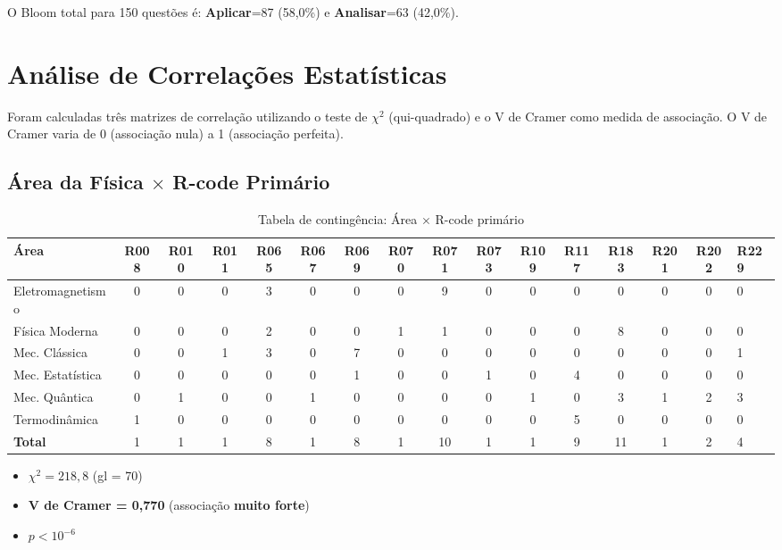 \documentclass[12pt,a4paper]{article}
\newcommand{\bloom}[1]{\textcolor{verdeexame}{\textbf{#1}}}
\begin{document}
O Bloom total para 150 questões é: \bloom{Aplicar}=87 (58,0\%) e
\bloom{Analisar}=63 (42,0\%).

\section{Análise de Correlações Estatísticas}

Foram calculadas três matrizes de correlação utilizando o teste de
$\chi^2$ (qui-quadrado) e o V de Cramer como medida de associação.
O V de Cramer varia de 0 (associação nula) a 1 (associação perfeita).

\subsection{Área da Física $\times$ R-code Primário}

\begin{table}[H]
\centering
\caption{Tabela de contingência: Área $\times$ R-code primário}
\label{tab:area_rcode}
\begin{tabular}{lcccccccccccccc}
\toprule
\textbf{Área} & R008 & R010 & R011 & R065 & R067 & R069 & R070 & R071 & R073 & R109 & R117 & R183 & R201 & R202 & R229 \\
\midrule
Eletromagnetismo & 0 & 0 & 0 & 3 & 0 & 0 & 0 & 9 & 0 & 0 & 0 & 0 & 0 & 0 & 0 \\
Física Moderna & 0 & 0 & 0 & 2 & 0 & 0 & 1 & 1 & 0 & 0 & 0 & 8 & 0 & 0 & 0 \\
Mec. Clássica & 0 & 0 & 1 & 3 & 0 & 7 & 0 & 0 & 0 & 0 & 0 & 0 & 0 & 0 & 1 \\
Mec. Estatística & 0 & 0 & 0 & 0 & 0 & 1 & 0 & 0 & 1 & 0 & 4 & 0 & 0 & 0 & 0 \\
Mec. Quântica & 0 & 1 & 0 & 0 & 1 & 0 & 0 & 0 & 0 & 1 & 0 & 3 & 1 & 2 & 3 \\
Termodinâmica & 1 & 0 & 0 & 0 & 0 & 0 & 0 & 0 & 0 & 0 & 5 & 0 & 0 & 0 & 0 \\
\midrule
\textbf{Total} & 1 & 1 & 1 & 8 & 1 & 8 & 1 & 10 & 1 & 1 & 9 & 11 & 1 & 2 & 4 \\
\bottomrule
\end{tabular}
\end{table}

\begin{itemize}
  \item $\chi^2 = 218,8$ (gl = 70)
  \item \textbf{V de Cramer = 0,770} (associação \textbf{muito forte})
  \item $p < 10^{-6}$
\end{itemize}
\end{document}
